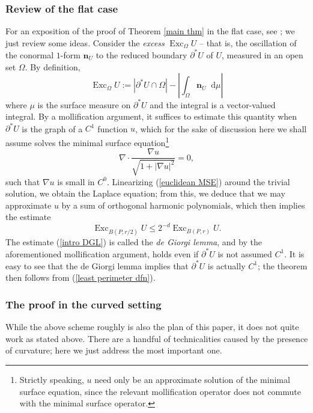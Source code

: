 \documentclass[reqno,11pt]{amsart}
\DeclareMathOperator{\Exc}{Exc}
\newcommand*\dif{\mathop{}\!\mathrm{d}}
\newcommand{\normal}{\mathbf n}
\newcommand{\dfn}[1]{\emph{#1}\index{#1}}
\theoremstyle{definition}
\numberwithin{equation}{section}
\begin{document}
\subsubsection{Review of the flat case}
For an exposition of the proof of Theorem \ref{main thm} in the flat case, see \cite[Chapters 6-9]{Giusti77}; we just review some ideas.
Consider the \dfn{excess} $\Exc_\Omega U$ -- that is, the oscillation of the conormal $1$-form $\normal_U$ to the reduced boundary $\partial^* U$ of $U$, measured in an open set $\Omega$.
By definition,
\begin{equation}\label{intro excess}
\Exc_\Omega U := |\partial^* U \cap \Omega| - \left|\int_\Omega \normal_U \dif \mu\right|
\end{equation}
where $\mu$ is the surface measure on $\partial^* U$ and the integral is a vector-valued integral.
By a mollification argument, it suffices to estimate this quantity when $\partial^* U$ is the graph of a $C^1$ function $u$, which for the sake of discussion here we shall assume solves the minimal surface equation\footnote{Strictly speaking, $u$ need only be an approximate solution of the minimal surface equation, since the relevant mollification operator does not commute with the minimal surface operator.}
\begin{equation}\label{euclidean MSE}
\nabla \cdot \frac{\nabla u}{\sqrt{1 + |\nabla u|^2}} = 0,
\end{equation}
such that $\nabla u$ is small in $C^0$. 
Linearizing (\ref{euclidean MSE}) around the trivial solution, we obtain the Laplace equation; from this, we deduce that we may approximate $u$ by a sum of orthogonal harmonic polynomials, which then implies the estimate 
\begin{equation}\label{intro DGL}
\Exc_{B(P, r/2)} U \leq 2^{-d} \Exc_{B(P, r)} U.
\end{equation}
The estimate (\ref{intro DGL}) is called the \dfn{de Giorgi lemma}, and by the aforementioned mollification argument, holds even if $\partial^* U$ is not assumed $C^1$.
It is easy to see that the de Giorgi lemma implies that $\partial^* U$ is actually $C^1$; the theorem then follows from (\ref{least perimeter dfn}).

\subsubsection{The proof in the curved setting}
While the above scheme roughly is also the plan of this paper, it does not quite work as stated above.
There are a handful of technicalities caused by the presence of curvature; here we just address the most important one.
\end{document}
